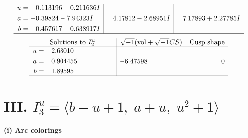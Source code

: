 \documentclass[1p]{elsarticle_modified}
\theoremstyle{definition}
\newcommand{\I}{\sqrt{-1}}
\begin{document}
$$\begin{array}{c|c|c}
\begin{aligned}
u &= \phantom{-}0.113196 - 0.211636 I \\
a &= -0.39824 - 7.94323 I \\
b &= \phantom{-}0.457617 + 0.638917 I\end{aligned}
 & \phantom{-}4.17812 - 2.68951 I & \phantom{-}7.17893 + 2.27785 I\\
 \hline 
 \end{array}$$\newpage$$\begin{array}{c|c|c}  
\text{Solutions to }I^u_{2}& \I (\text{vol} + \sqrt{-1}CS) & \text{Cusp shape}\\
 \hline 
\begin{aligned}
u &= \phantom{-}2.68010\phantom{ +0.000000I} \\
a &= \phantom{-}0.904455\phantom{ +0.000000I} \\
b &= \phantom{-}1.89595\phantom{ +0.000000I}\end{aligned}
 & -6.47598\phantom{ +0.000000I} & \phantom{-0.000000 } 0\\
 \hline 
 \end{array}$$\newpage\newpage\renewcommand{\arraystretch}{1}
\centering \section*{III. $I^u_{3}= \langle b- u+1,\;a+u,\;u^2+1 \rangle$}
\flushleft \textbf{(i) Arc colorings}\\
\end{document}
